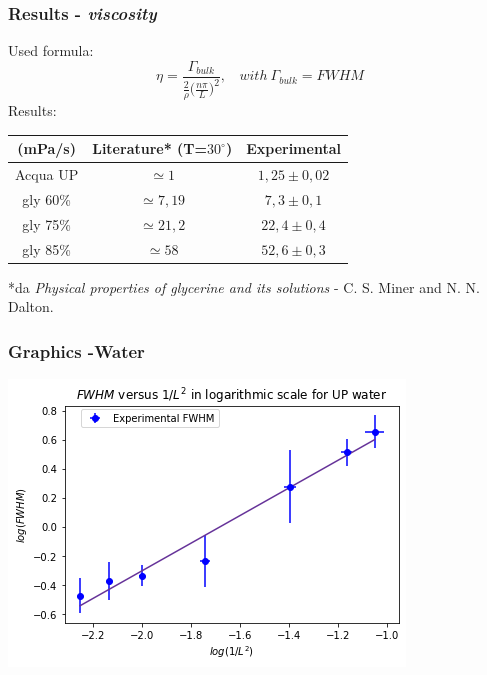 \documentclass[xcolor=table]{beamer}
\begin{document}
\begin{frame}

\frametitle{Results - \textit{viscosity}}
\fontsize{11}{10.2} \selectfont
Used formula:
\begin{equation}
	 \eta = \frac{\Gamma_{bulk}}{\frac{2}{\rho}\big(\frac{n\pi}{L}\big)^2}, \ \ \ \ with\ \Gamma_{bulk} =FWHM
\end{equation}
Results:
\begin{table}[]
	\begin{tabular}{|c|c|c|}
		\hline
		(mPa/s)  & Literature*  (T=$30^\circ$) & Experimental  \\ 
		\hline
		Acqua UP & $\simeq 1$ & $1,25 \pm 0,02$ \\
		gly 60\% & $\simeq 7,19$ & $7,3 \pm 0,1$     \\
		gly 75\% & $\simeq 21,2$ & $22,4 \pm 0,4$   \\
		gly 85\% & $\simeq 58$  & $52,6 \pm 0,3$\\
	\hline  
	\end{tabular}
\end{table}
\fontsize{9}{10.2} \selectfont
*da \textit{Physical properties of glycerine and its solutions} - C. S. Miner and N. N. Dalton.
\end{frame}


\begin{frame}

\frametitle{Graphics -Water}
\fontsize{10}{10.2} \selectfont
\includegraphics[width=0.8\columnwidth]{grafvisc.PNG}
\end{frame}
\end{document}
